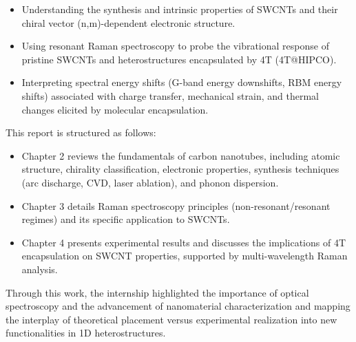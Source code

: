 \begin{itemize}
    \item Understanding the synthesis and intrinsic properties of SWCNTs and their chiral vector (n,m)-dependent electronic structure.
\end{itemize}


\begin{itemize}
    \item Using resonant Raman spectroscopy to probe the vibrational response of pristine SWCNTs and heterostructures encapsulated by 4T (4T@HIPCO).
\end{itemize}


\begin{itemize}
    \item Interpreting spectral energy shifts (G-band energy downshifts, RBM energy shifts) associated with charge transfer, mechanical strain, and thermal changes elicited by molecular encapsulation.
\end{itemize}
This report is structured as follows:

\begin{itemize}
    \item Chapter 2 reviews the fundamentals of carbon nanotubes, including atomic structure, chirality classification, electronic properties, synthesis techniques (arc discharge, CVD, laser ablation), and phonon dispersion.
\end{itemize}

\begin{itemize}
    \item Chapter 3 details Raman spectroscopy principles (non-resonant/resonant regimes) and its specific application to SWCNTs.
\end{itemize}

\begin{itemize}
    \item Chapter 4 presents experimental results and discusses the implications of 4T encapsulation on SWCNT properties, supported by multi-wavelength Raman analysis.
\end{itemize}

Through this work, the internship highlighted the importance of optical spectroscopy and the advancement of nanomaterial characterization and mapping the interplay of theoretical placement versus experimental realization into new functionalities in 1D heterostructures.